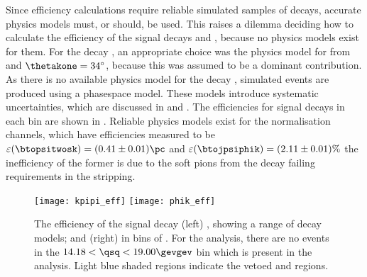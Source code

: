 



Since efficiency calculations require reliable simulated samples of decays, accurate physics
models must, or should, be used.
This raises a dilemma deciding how to calculate the efficiency of the signal decays \btokpipimumu
and \btophikmumu, because no physics models exist for them.
For the decay \btokpipimumu, an appropriate choice
was the physics model for 
from  and $\thetakone=34^\circ$, because this was assumed to be a dominant
contribution.
As there is no available physics model for the decay \btophikmumu, simulated events are produced
using a phasespace model.
These models introduce systematic uncertainties, which are discussed in  and
.
The efficiencies for signal decays in each \qsq bin are shown in .
Reliable physics models exist for the normalisation channels, which have efficiencies measured to
be $\varepsilon(\btopsitwosk)=(0.41\pm0.01)\pc$ and $\varepsilon(\btojpsiphik)=(2.11\pm0.01)\%$
the inefficiency of the former is due to the soft pions from the \psitwos decay failing \pt
requirements in the stripping.

\begin{figure}[t]
  \begin{center}
    \texttt{[image: kpipi\_eff]}
    \texttt{[image: phik\_eff]}
    \caption[Efficiency as a function of \qsq for \btokpipimumu and \btophikmumu]
    {
      The efficiency of the signal decay
      (left) \btokpipimumu, showing a range of decay models; and
      (right) \btophikmumu in bins of \qsq.
      For the \btophikmumu analysis, there are no events in the $14.18<\qsq<19.00\gevgev$ bin which
      is present in the \btokpipimumu analysis.
      Light blue shaded regions indicate the vetoed \jpsi and \psitwos regions.
    }
    \label{fig:hhh:effs}
  \end{center}
\end{figure}









